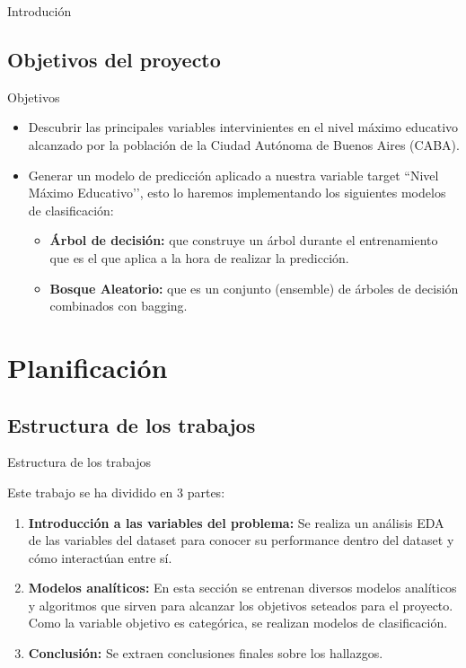 \documentclass[pdf]{beamer}
\begin{document}
{\begin{frame}{Introdución}
\end{frame}

    \subsection{Objetivos del proyecto}

\begin{frame}{Objetivos}

    \begin{itemize}
        \justifying%
        \item Descubrir las principales variables intervinientes en el nivel máximo educativo alcanzado por la población de la Ciudad Autónoma de Buenos Aires (CABA).
        \item Generar un modelo de predicción aplicado a nuestra variable target ``Nivel Máximo Educativo’’, esto lo haremos implementando los siguientes modelos de clasificación:
        \begin{itemize}
            \justifying%
            \item \textbf{Árbol de decisión:} que construye un árbol durante el entrenamiento que es el que aplica a la hora de realizar la predicción.
            \item \textbf{Bosque Aleatorio:} que es un conjunto (ensemble) de árboles de decisión combinados con bagging.
        \end{itemize}
    \end{itemize}

\end{frame}

\section{Planificación}

    \subsection*{Estructura de los trabajos}

\begin{frame}{Estructura de los trabajos}

    Este trabajo se ha dividido en 3 partes:
    \begin{enumerate}
        \justifying%
        \item \textbf{Introducción a las variables del problema:} Se realiza un análisis EDA de las variables del dataset para  conocer su performance dentro del dataset y cómo interactúan entre sí. 
        \item \textbf{Modelos analíticos:} En esta sección se entrenan diversos modelos analíticos y algoritmos que sirven para alcanzar los objetivos seteados para el proyecto. Como la variable objetivo es categórica, se realizan modelos de clasificación.
        \item \textbf{Conclusión:} Se extraen conclusiones finales sobre los hallazgos.
        

\end{enumerate}
\end{frame}}
\end{document}
